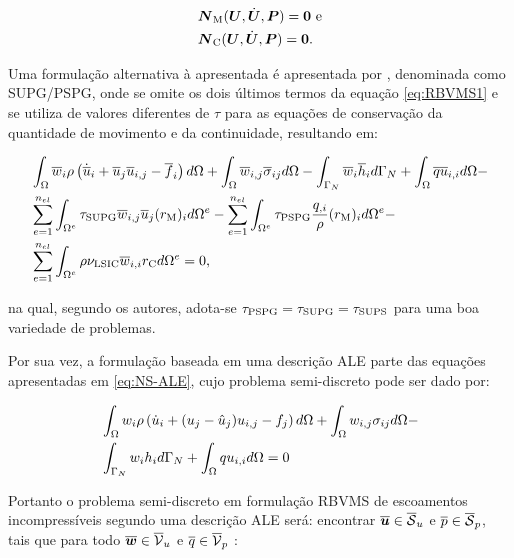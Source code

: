 \begin{subequations}
    \begin{align}
         & \boldsymbol{N}_\mathrm{M}(\boldsymbol{U},\dot{\boldsymbol{U}},\boldsymbol{P})=\boldsymbol{0}\text{ e} \\
         & \boldsymbol{N}_\mathrm{C}(\boldsymbol{U},\dot{\boldsymbol{U}},\boldsymbol{P})=\boldsymbol{0}\text{.}
    \end{align}
\end{subequations}

Uma formulação alternativa à apresentada é apresentada por , denominada como SUPG/PSPG, onde se omite os dois últimos termos da equação \ref{eq:RBVMS1} e se utiliza de valores diferentes de $\tau$ para as equações de conservação da quantidade de movimento e da continuidade, resultando em:

\begin{equation}
    \begin{split}
        &\int_{\Omega}{\overline{w}_i\rho\left({\dot{\overline{u}}_i+\overline{u}_j\overline{u}_{i,j}-\overline{f}_i}\right) d\Omega}+\int_{\Omega}{\overline{w}_{i,j}\overline{\sigma}_{ij} d\Omega}-\int_{\Gamma_N}{\overline{w}_i\overline{h}_i d\Gamma_N}+\int_{\Omega}{\overline{q}\overline{u}_{i,i} d\Omega}-\\
        &\sum_{e=1}^{n_{el}}{\int_{\Omega^e}{\tau_{\mathrm{SUPG}}\overline{w}_{i,j}\overline{u}_j(r_\mathrm{M})_{i} d\Omega^e}}-\sum_{e=1}^{n_{el}}{\int_{\Omega^e}{\tau_{\mathrm{PSPG}}\frac{q_{,i}}{\rho}(r_\mathrm{M})_{i} d\Omega^e}}-\\
        &\sum_{e=1}^{n_{el}}{\int_{\Omega^e}{\rho\nu_{\mathrm{LSIC}}\overline{w}_{i,i}r_\mathrm{C} d\Omega^e}}=0
        \text{,}
        \label{eq:SUPG-PSPG}
    \end{split}
\end{equation}

\noindent na qual, segundo os autores, adota-se $\tau_{\mathrm{PSPG}}=\tau_{\mathrm{SUPG}}=\tau_{\mathrm{SUPS}}$ para uma boa variedade de problemas.

Por sua vez, a formulação baseada em uma descrição ALE parte das equações apresentadas em \ref{eq:NS-ALE}, cujo problema semi-discreto pode ser dado por:

\begin{equation}
    \begin{split}
        &\int_{\Omega}{w_i\rho\left({\dot{u}_i+(u_j-\hat{u}_j)u_{i,j}-f_j}\right) d\Omega}+\int_{\Omega}{w_{i,j}\sigma_{ij} d\Omega}-\\
        &\int_{\Gamma_N}{w_ih_i d\Gamma_N}+\int_{\Omega}{qu_{i,i} d\Omega}=0
    \end{split}
\end{equation}

Portanto o problema semi-discreto em formulação RBVMS de escoamentos incompressíveis segundo uma descrição ALE será: encontrar $\overline{\boldsymbol{u}}\in\overline{\mathcal{S}}_u$ e $\overline{p}\in\overline{\mathcal{S}}_p$, tais que para todo $\overline{\boldsymbol{w}}\in\overline{\mathcal{V}}_u$ e $\overline{q}\in\overline{\mathcal{V}}_p$ \cite{bazilevs2013computational}:

